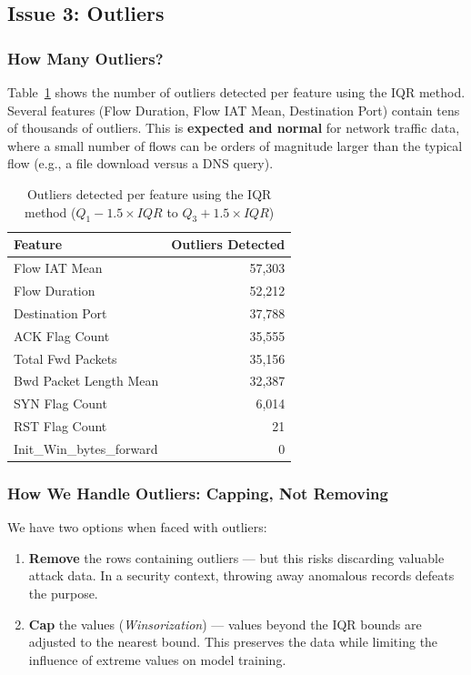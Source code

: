 \documentclass[12pt,a4paper]{report}
\begin{document}
\subsection{Issue 3: Outliers}

\subsubsection{How Many Outliers?}

Table~\ref{tab:outliers} shows the number of outliers detected per feature using the IQR method. Several features (Flow Duration, Flow IAT Mean, Destination Port) contain tens of thousands of outliers. This is \textbf{expected and normal} for network traffic data, where a small number of flows can be orders of magnitude larger than the typical flow (e.g., a file download versus a DNS query).

\begin{table}[H]
\centering
\caption{Outliers detected per feature using the IQR method ($Q_1 - 1.5 \times IQR$ to $Q_3 + 1.5 \times IQR$)}
\label{tab:outliers}
\begin{tabular}{lr}
\toprule
\textbf{Feature} & \textbf{Outliers Detected} \\
\midrule
Flow IAT Mean & 57,303 \\
Flow Duration & 52,212 \\
Destination Port & 37,788 \\
ACK Flag Count & 35,555 \\
Total Fwd Packets & 35,156 \\
Bwd Packet Length Mean & 32,387 \\
SYN Flag Count & 6,014 \\
RST Flag Count & 21 \\
Init\_Win\_bytes\_forward & 0 \\
\bottomrule
\end{tabular}
\end{table}

\subsubsection{How We Handle Outliers: Capping, Not Removing}

We have two options when faced with outliers:
\begin{enumerate}
    \item \textbf{Remove} the rows containing outliers --- but this risks discarding valuable attack data. In a security context, throwing away anomalous records defeats the purpose.
    \item \textbf{Cap} the values (\textit{Winsorization}) --- values beyond the IQR bounds are adjusted to the nearest bound. This preserves the data while limiting the influence of extreme values on model training.
\end{enumerate}
\end{document}
